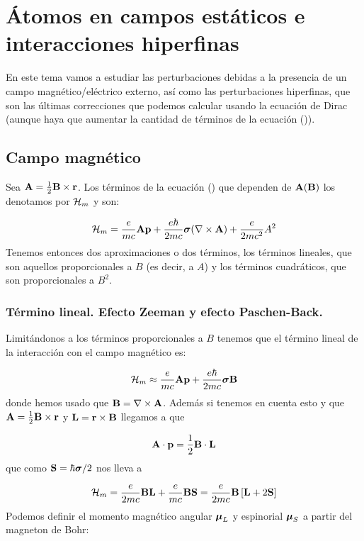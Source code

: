 \chapter{Átomos en campos estáticos e interacciones hiperfinas} \label{Ch:02}

En este tema vamos a estudiar las perturbaciones debidas a la presencia de un campo magnético/eléctrico externo, así como las perturbaciones hiperfinas, que son las últimas correcciones que podemos calcular usando la ecuación de Dirac (aunque haya que aumentar la cantidad de términos de la ecuación ()).

\section{Campo magnético}

Sea $\mathbf{A} = \frac{1}{2} \mathbf{B} \times \mathbf{r}$. Los términos de la ecuación () que dependen de $\mathbf{A}(\mathbf{B})$ los denotamos por $\mathcal{H}_m$ y son:

\begin{equation}
	\mathcal{H}_m = \frac{e}{mc} \mathbf{A} \mathbf{p} + \frac{e\hbar}{2mc} \boldsymbol{\sigma} (\nabla \times \mathbf{A})  + \frac{e}{2mc^2} A^2
\end{equation} 
Tenemos entonces dos aproximaciones o dos términos, los términos lineales, que son aquellos proporcionales a $B$ (es decir, a $A$) y los términos cuadráticos, que son proporcionales a $B^2$. 

\subsection{Término lineal. Efecto Zeeman y efecto Paschen-Back.}

Limitándonos a los términos proporcionales a $B$ tenemos que el término lineal de la interacción con el campo magnético es:

\begin{equation}
	\mathcal{H}_m  \approx \frac{e}{mc} \mathbf{A} \mathbf{p} +  \frac{e\hbar}{2mc} \boldsymbol{\sigma} \mathbf{B}
\end{equation}
donde hemos usado que $\mathbf{B} = \nabla \times \mathbf{A}$. Además si tenemos en cuenta esto y que $\mathbf{A} = \frac{1}{2} \mathbf{B} \times \mathbf{r}$ y $\mathbf{L} = \mathbf{r} \times \mathbf{B}$ llegamos a que 

\begin{equation}
	\mathbf{A} \cdot \mathbf{p} = \frac{1}{2}\mathbf{B} \cdot \mathbf{L}
\end{equation}
que como $\mathbf{S}=\hbar \boldsymbol{\sigma} /2$ nos lleva a 

\begin{equation}
	\mathcal{H}_m = \frac{e}{2mc} \mathbf{B} \mathbf{L} + \frac{e}{mc} \mathbf{B} \mathbf{S} = \frac{e}{2mc} \mathbf{B} \left[ \mathbf{L} + 2 \mathbf{S} \right]
\end{equation}
Podemos definir el momento magnético angular $\boldsymbol{\mu}_L$ y espinorial $\boldsymbol{\mu}_S$ a partir del magneton de Bohr:

